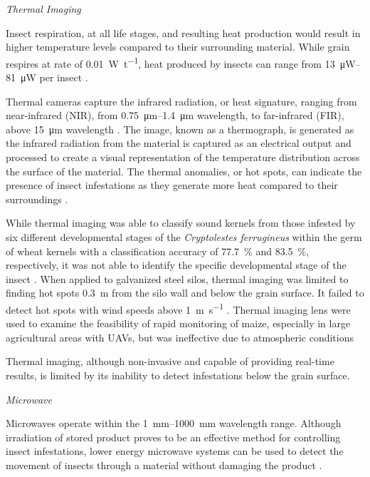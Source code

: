 \documentclass[../Vibro-Acoustic Signatures and Detection Algorithms for Stored Product Insects.tex]{subfiles}
\begin{document}
\newpage
\textit{Thermal Imaging}

Insect respiration, at all life stages, and resulting heat production would result in higher temperature levels compared to their surrounding material. While grain respires at rate of \SI{0.01}{\watt\per\tonne}, heat produced by insects can range from \SIrange{13}{81}{\micro\watt} per insect \cite{manickavasaganThermalImagingDetect2008}.

Thermal cameras capture the infrared radiation, or heat signature, ranging from near-infrared (NIR), from \SIrange{0.75}{1.4}{\micro\meter} wavelength, to far-infrared (FIR), above \SI{15}{\micro\meter} wavelength \cite{manickavasaganThermalImagingDetect2008}. The image, known as a thermograph, is generated as the infrared radiation from the material is captured as an electrical output and processed to create a visual representation of the temperature distribution across the surface of the material. The thermal anomalies, or hot spots, can indicate the presence of insect infestations as they generate more heat compared to their surroundings \cite{bangaTechniquesInsectDetection2018}.

While thermal imaging was able to classify sound kernels from those infested by six different developmental stages of the \textit{Cryptolestes ferrugineus} within the germ of wheat kernels with a classification accuracy of \SI{77.7}{\percent} and \SI{83.5}{\percent}, respectively, it was not able to identify the specific developmental stage of the insect \cite{manickavasaganThermalImagingDetect2008}. When applied to galvanized steel silos, thermal imaging was limited to finding hot spots \SI{0.3}{\meter} from the silo wall and below the grain surface. It failed to detect hot spots with wind speeds above \SI{1}{\meter\per\second} \cite{a.manickavasaganThermalImagingStored2006}. Thermal imaging lens were used to examine the feasibility of rapid monitoring of maize, especially in large agricultural areas with UAVs, but was ineffective due to atmospheric conditions \cite{chenResearchPestImage2018}

Thermal imaging, although non-invasive and capable of providing real-time results, is limited by its inability to detect infestations below the grain surface.

\textit{Microwave}

Microwaves operate within the \SIrange{1}{1000}{\milli\meter} wavelength range. Although irradiation of stored product proves to be an effective method for controlling insect infestations, lower energy microwave systems can be used to detect the movement of insects through a material without damaging the product \cite{shayestehMortalityBehaviourTwo1996}.
\end{document}
